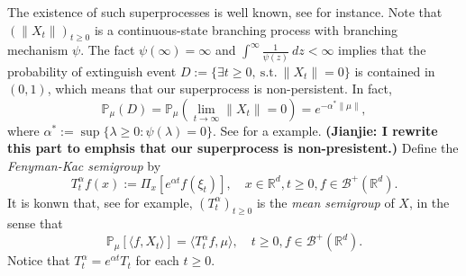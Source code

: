 \documentclass[12pt, a4paper]{amsart}
\theoremstyle{definition}
\numberwithin{equation}{section}
\begin{document}
    The existence of such superprocesses is well known, see \cite{EB} for instance.
    Note that $(\|X_t\|)_{t\geq 0}$ is a continuous-state branching process with branching mechanism $\psi$.
    The fact $\psi(\infty)=\infty$  and $\int^{\infty}\frac{1}{\psi(z)}~dz<\infty$ implies that the probability of extinguish event $D:= \{\exists t\geq 0,~\text{s.t.}~\|X_t\|=0\}$ is contained in $(0,1)$, which means that our superprocess is non-persistent.
    In fact,
\begin{equation}
    \mathbb{P}_{\mu}(D)= \mathbb{P}_{\mu} (\lim_{t \to \infty}\|X_t\|=0 )
    = e^{-\alpha^* \|\mu\|},
\end{equation}
    where $\alpha^* := \sup\{\lambda \geq 0: \psi(\lambda) = 0\}$. See \cite[Theorem 12.5 \& Theorem 12.7]{Kyprianou2014Fluctuations} for a example.
    {\bf (Jianjie: I rewrite this part to emphsis that our superprocess is non-presistent.)}
    Define the \emph{Fenyman-Kac semigroup} by
\begin{equation}\label{meansemigroup}
    T^{\alpha}_t f(x)
    := \Pi_x [e^{\alpha t}f(\xi_t)],
    \quad x\in \mathbb{R}^d,t\geq 0, f\in \mathscr B^+(\mathbb R^d).
\end{equation}
    It is konwn that, see \cite[Proposition 2.27]{Li2011Measure-valued} for example, $(T^\alpha_t)_{t\geq 0}$ is the \emph{mean semigroup} of $X$, in the sense that
\begin{equation}\label{eq:meanformula}
    \mathbb{P}_{\mu}[\langle f, X_t \rangle]
    = \langle T_t^\alpha f, \mu \rangle,
    \quad t\geq 0, f\in \mathscr B^+(\mathbb R^d).
\end{equation}
Notice that $T^{\alpha}_t =e^{\alpha t}T_t$ for each $t \geq 0$.
\end{document}
